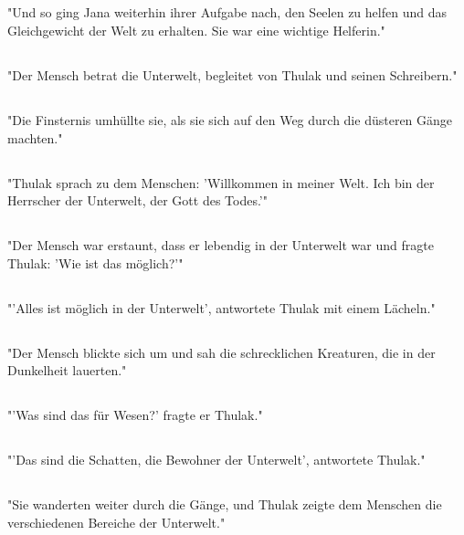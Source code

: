 \documentclass{article}
\begin{document}
\subsection{}
"Und so ging Jana weiterhin ihrer Aufgabe nach, den Seelen zu helfen und das Gleichgewicht der Welt zu erhalten. Sie war eine wichtige Helferin."
\subsection{}
"Der Mensch betrat die Unterwelt, begleitet von Thulak und seinen Schreibern."
\subsection{}
"Die Finsternis umhüllte sie, als sie sich auf den Weg durch die düsteren Gänge machten."
\subsection{}
"Thulak sprach zu dem Menschen: 'Willkommen in meiner Welt. Ich bin der Herrscher der Unterwelt, der Gott des Todes.'"
\subsection{}
"Der Mensch war erstaunt, dass er lebendig in der Unterwelt war und fragte Thulak: 'Wie ist das möglich?'"
\subsection{}
"'Alles ist möglich in der Unterwelt', antwortete Thulak mit einem Lächeln."
\subsection{}
"Der Mensch blickte sich um und sah die schrecklichen Kreaturen, die in der Dunkelheit lauerten."
\subsection{}
"'Was sind das für Wesen?' fragte er Thulak."
\subsection{}
"'Das sind die Schatten, die Bewohner der Unterwelt', antwortete Thulak."
\subsection{}
"Sie wanderten weiter durch die Gänge, und Thulak zeigte dem Menschen die verschiedenen Bereiche der Unterwelt."
\end{document}
